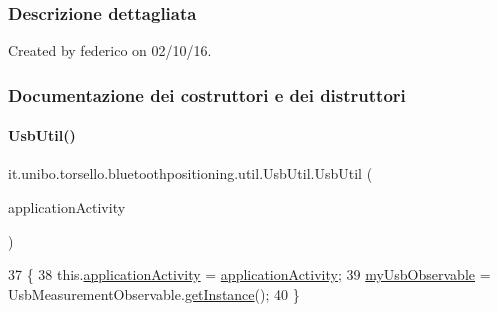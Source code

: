 \subsubsection{Descrizione dettagliata}
Created by federico on 02/10/16. 

\subsubsection{Documentazione dei costruttori e dei distruttori}
\hypertarget{classit_1_1unibo_1_1torsello_1_1bluetoothpositioning_1_1util_1_1UsbUtil_aff938c0dddb8fd4549b0a3dddba94473_aff938c0dddb8fd4549b0a3dddba94473}{}\label{classit_1_1unibo_1_1torsello_1_1bluetoothpositioning_1_1util_1_1UsbUtil_aff938c0dddb8fd4549b0a3dddba94473_aff938c0dddb8fd4549b0a3dddba94473} 
\paragraph{\texorpdfstring{Usb\+Util()}{UsbUtil()}}
{\footnotesize\ttfamily it.\+unibo.\+torsello.\+bluetoothpositioning.\+util.\+Usb\+Util.\+Usb\+Util (\begin{DoxyParamCaption}\item[{\hyperlink{classit_1_1unibo_1_1torsello_1_1bluetoothpositioning_1_1activities_1_1ApplicationActivity}{Application\+Activity}}]{application\+Activity }\end{DoxyParamCaption})}


\begin{DoxyCode}
37                                                             \{
38         this.\hyperlink{classit_1_1unibo_1_1torsello_1_1bluetoothpositioning_1_1util_1_1UsbUtil_afdcd78c04f043fafe29eb2cc006b5843_afdcd78c04f043fafe29eb2cc006b5843}{applicationActivity} = \hyperlink{classit_1_1unibo_1_1torsello_1_1bluetoothpositioning_1_1util_1_1UsbUtil_afdcd78c04f043fafe29eb2cc006b5843_afdcd78c04f043fafe29eb2cc006b5843}{applicationActivity};
39         \hyperlink{classit_1_1unibo_1_1torsello_1_1bluetoothpositioning_1_1util_1_1UsbUtil_a1c500d0f1a3f3a11b16015acc49929e0_a1c500d0f1a3f3a11b16015acc49929e0}{myUsbObservable} = UsbMeasurementObservable.\hyperlink{classit_1_1unibo_1_1torsello_1_1bluetoothpositioning_1_1observables_1_1UsbMeasurementObservable_aff4f89490f3f2c11ca4feea933d12d88_aff4f89490f3f2c11ca4feea933d12d88}{getInstance}();
40     \}
\end{DoxyCode}


